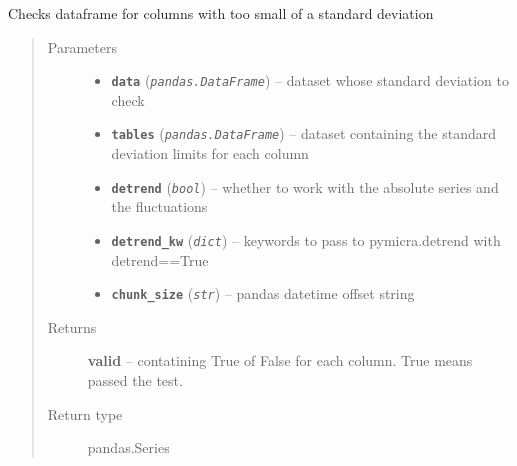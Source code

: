 \documentclass[a4paper,10pt,oneside]{sphinxmanual}
\begin{document}
\begin{fulllineitems}
\label{pymicra:pymicra.tests.check_std}
Checks dataframe for columns with too small of a standard deviation
\begin{quote}\begin{description}
\item[{Parameters}] \leavevmode\begin{itemize}
\item {} 
\textbf{\texttt{data}} (\emph{\texttt{pandas.DataFrame}}) -- dataset whose standard deviation to check

\item {} 
\textbf{\texttt{tables}} (\emph{\texttt{pandas.DataFrame}}) -- dataset containing the standard deviation limits for each column

\item {} 
\textbf{\texttt{detrend}} (\emph{\texttt{bool}}) -- whether to work with the absolute series and the fluctuations

\item {} 
\textbf{\texttt{detrend\_kw}} (\emph{\texttt{dict}}) -- keywords to pass to pymicra.detrend with detrend==True

\item {} 
\textbf{\texttt{chunk\_size}} (\emph{\texttt{str}}) -- pandas datetime offset string

\end{itemize}

\item[{Returns}] \leavevmode
\textbf{valid} -- contatining True of False for each column. True means passed the test.

\item[{Return type}] \leavevmode
pandas.Series

\end{description}\end{quote}

\end{fulllineitems}
\end{document}
